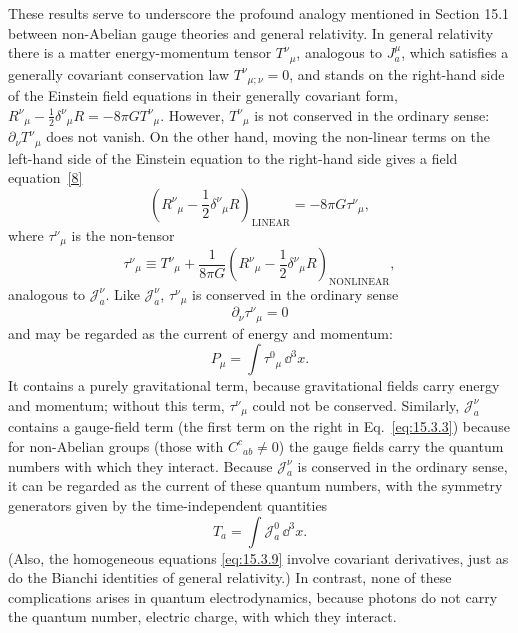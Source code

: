 These results serve to underscore the profound analogy mentioned in Section 15.1
between non-Abelian gauge theories and general relativity. In general relativity
there is a matter energy-momentum tensor $T^\nu{}_\mu$, analogous to
$J_a^\mu$, which satisfies a generally covariant conservation law
$T^\nu{}_{\mu;\nu}=0$, and stands on the right-hand side of the Einstein field
equations in their generally covariant form,
$R^\nu{}_\mu-\frac12\delta^\nu{}_\mu R=-8\pi G T^\nu{}_\mu$. However,
$T^\nu{}_\mu$ is not conserved in the ordinary sense:
$\partial_\nu T^\nu{}_\mu$ does not vanish. On the other hand, moving the
non-linear terms on the left-hand side of the Einstein equation to the right-hand
side gives a field equation~\hyperref[ch15-ref-8]{[8]}
\[
 \left(R^\nu{}_\mu-\frac12\delta^\nu{}_\mu R\right)_{\mathrm{LINEAR}}
 =-8\pi G\tau^\nu{}_\mu ,
\]
where $\tau^\nu{}_\mu$ is the non-tensor
\[
 \tau^\nu{}_\mu\equiv T^\nu{}_\mu
 +\frac{1}{8\pi G}
 \left(R^\nu{}_\mu-\frac12\delta^\nu{}_\mu R\right)_{\mathrm{NONLINEAR}} ,
\]
analogous to $\mathcal J_a^\nu$. Like $\mathcal J_a^\nu$,
$\tau^\nu{}_\mu$ is conserved in the ordinary sense
\[
 \partial_\nu\tau^\nu{}_\mu=0
\]
and may be regarded as the current of energy and momentum:
\[
 P_\mu=\int\tau^0{}_\mu\,\dd^3x .
\]
It contains a purely gravitational term, because gravitational fields carry
energy and momentum; without this term, $\tau^\nu{}_\mu$ could not be conserved.
Similarly, $\mathcal J_a^\nu$ contains a gauge-field term (the first term
on the right in Eq.~\eqref{eq:15.3.3}) because for non-Abelian groups (those with
$C^c{}_{ab}\ne0$) the gauge fields carry the quantum numbers with
which they interact. Because $\mathcal J_a^\nu$ is conserved in the
ordinary sense, it can be regarded as the current of these quantum numbers, with
the symmetry generators given by the time-independent quantities
\begin{equation}
 T_a=\int\mathcal J_a^0\,\dd^3x .
 \tag{15.3.10}\label{eq:15.3.10}
\end{equation}
(Also, the homogeneous equations \eqref{eq:15.3.9} involve covariant derivatives,
just as do the Bianchi identities of general relativity.) In contrast, none of
these complications arises in quantum electrodynamics, because photons do not
carry the quantum number, electric charge, with which they interact.
